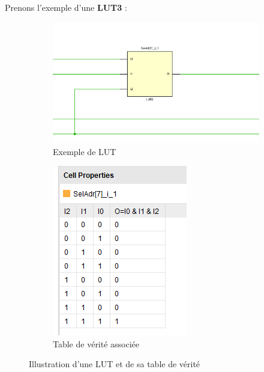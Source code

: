 Prenons l'exemple d'une \textbf{LUT3} :  

\begin{figure}[H]
    \centering
    \begin{subfigure}[b]{0.55\linewidth}
        \centering
        \includegraphics[width=\linewidth]{images/Routage/LUT_EXEMPLE.png}
        \caption{Exemple de LUT}
        \label{fig:lut_exemple}
    \end{subfigure}
    \hfill
    \begin{subfigure}[b]{0.25\linewidth}
        \centering
        \includegraphics[width=\linewidth]{images/Routage/TABLE_LUT.png}
        \caption{Table de vérité associée}
        \label{fig:table_lut}
    \end{subfigure}
    \caption{Illustration d'une LUT et de sa table de vérité}
    \label{fig:lut_complete}
\end{figure}

